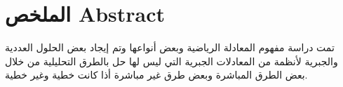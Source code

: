 \chapter*{الملخص Abstract}
تمت دراسة مفهوم المعادلة الرياضية وبعض أنواعها وتم إيجاد بعض الحلول العددية والجبرية لأنظمة من المعادلات الجبرية التي ليس لها حل بالطرق التحليلية من خلال بعض الطرق المباشرة وبعض طرق غير مباشرة أذا كانت خطية وغير خطية.
